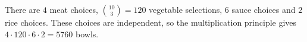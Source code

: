 There are $4$ meat choices, $\binom{10}3=120$ vegetable selections, $6$ sauce choices and $2$ rice choices. These choices are independent, so the multiplication principle gives $4\cdot120\cdot6\cdot2=\boxed{5760}$ bowls.
